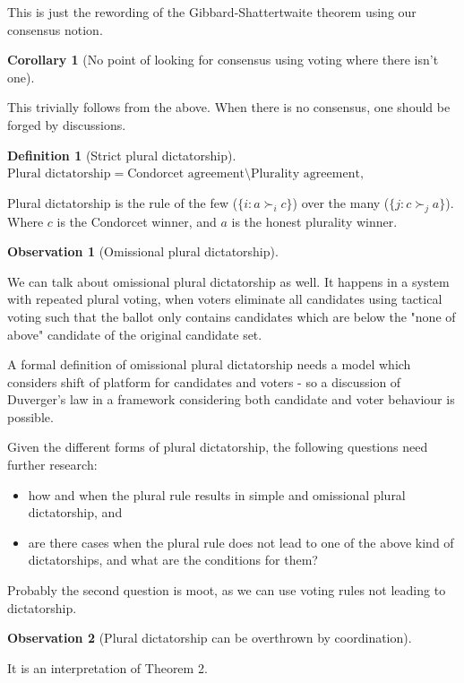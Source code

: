 \documentclass{article}
\newtheorem{corollary}{Corollary}
\newtheorem{definition}{Definition}
\newtheorem{observation}{Observation}
\begin{document}
This is just the rewording of the Gibbard-Shattertwaite theorem using our consensus notion.

\begin{corollary}[No point of looking for consensus using voting where there isn't one]
\end{corollary} 

This trivially follows from the above. When there is no consensus, one should be forged by discussions.

\begin{definition}[Strict plural dictatorship]

$\text{Plural dictatorship} = \text{Condorcet agreement} \setminus \text{Plurality agreement},$

\end{definition}

Plural dictatorship is the rule of the few ($\{i: a \succ_i c\}$) over the many ($\{j: c \succ_j a\}$). Where $c$ is the Condorcet winner, and $a$ is the honest plurality winner.

\begin{observation}[Omissional plural dictatorship]
\end{observation}

We can talk about omissional plural dictatorship as well. It happens in a system with repeated plural voting, when voters eliminate all candidates using tactical voting such that the ballot only contains candidates which are below the "none of above" candidate of the original candidate set.

A formal definition of omissional plural dictatorship needs a model which considers shift of platform for candidates and voters - so a discussion of Duverger's law in a framework considering both candidate and voter behaviour is possible.


Given the different forms of plural dictatorship, the following questions need further research:
\begin{itemize}
\item how and when the plural rule results in simple and omissional plural dictatorship, and
\item are there cases when the plural rule does not lead to one of the above kind of dictatorships, and what are the conditions for them?
\end{itemize}

Probably the second question is moot, as we can use voting rules not leading to dictatorship.


\begin{observation}[Plural dictatorship can be overthrown by coordination]
\end{observation} 
It is an interpretation of Theorem 2.
\end{document}
